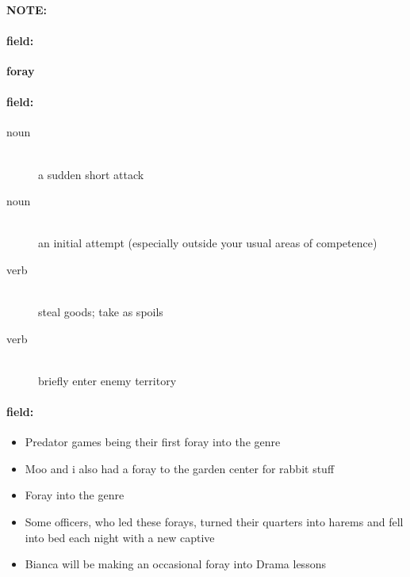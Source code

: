 \documentclass[12pt]{article}
\newenvironment{note}{\paragraph{NOTE:}}{}
\newenvironment{field}{\paragraph{field:}}{}
\begin{document}
\begin{note}
\begin{field}
\textbf{\large foray}
\end{field}


\begin{field}
\begin{description}
\item[noun] \hfill \\ 
a sudden short attack

\item[noun] \hfill \\ 
an initial attempt (especially outside your usual areas of competence)

\item[verb] \hfill \\ 
steal goods; take as spoils

\item[verb] \hfill \\ 
briefly enter enemy territory

\end{description}
\end{field}

\begin{field}
\begin{itemize}
\item Predator games being their first foray into the genre
\item Moo and i also had a foray to the garden center for rabbit stuff
\item Foray into the genre
\item Some officers, who led these forays, turned their quarters into harems and fell into bed each night with a new captive
\item Bianca will be making an occasional foray into Drama lessons
\end{itemize}
\end{field}
\end{note}
\end{document}
